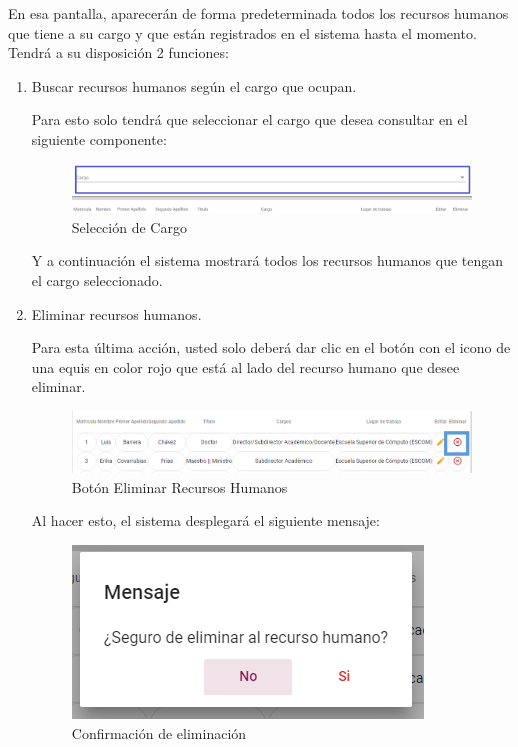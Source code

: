         En esa pantalla, aparecerán de forma predeterminada todos los recursos humanos que tiene a su cargo y que están registrados en el sistema hasta el momento. Tendrá a su disposición 2 funciones:
        \newpage
        \begin{enumerate}

            \item   Buscar recursos humanos según el cargo que ocupan.

                Para esto solo tendrá que seleccionar el cargo que desea consultar en el siguiente componente:

                \begin{figure}[H]
                    \centering
                    \hypertarget{cargo1}{\includegraphics[width=0.7\linewidth]{images/SP1/BtnCargo1}}
                    \caption{Selección de Cargo}
                    \label{cargo1}
                \end{figure}

                 Y a continuación el sistema mostrará todos los recursos humanos que tengan el cargo seleccionado.

                    \item Eliminar recursos humanos.

                Para esta última acción, usted solo deberá dar clic en el botón con el icono de una equis en color rojo que está al lado del recurso humano que desee  eliminar.

                \begin{figure}[H]
                    \centering
                    \hypertarget{eliminar}{\includegraphics[width=0.7\linewidth]{images/SP1/BtnEliminar}}
                    \caption{Botón Eliminar Recursos Humanos}
                    \label{eliminar}
                \end{figure}

                Al hacer esto, el sistema desplegará el siguiente mensaje:

               \begin{figure}[H]
                    \centering
                    \includegraphics[width=0.4\linewidth]{images/SP1/MSG22}
                \caption{Confirmación de eliminación}
                \label{confirmarE}


\end{figure}
\end{enumerate}
